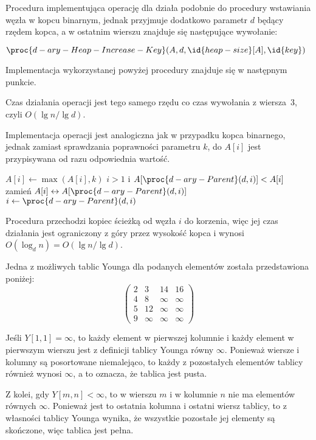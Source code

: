 \subproblem %
Procedura  implementująca operację  dla  działa podobnie do procedury wstawiania węzła w kopcu binarnym, jednak przyjmuje dodatkowo parametr $d$ będący rzędem kopca, a w ostatnim wierszu znajduje się następujące wywołanie:
\begin{codebox}
\setcounter{codelinenumber}{2}
\li	$\proc{d-ary-Heap-Increase-Key}(A,d,\id{heap-size}[A],\id{key})$
\end{codebox}
Implementacja wykorzystanej powyżej procedury znajduje się w następnym punkcie.

Czas działania operacji  jest tego samego rzędu co czas wywołania z wiersza~3, czyli $O(\lg n/\!\lg d)$.

\subproblem %
Implementacja operacji jest analogiczna jak w przypadku kopca binarnego, jednak zamiast sprawdzania poprawności parametru $k$, do $A[i]$ jest przypisywana od razu odpowiednia wartość.
\begin{codebox}
\li	$A[i]\gets\max(A[i],k)$
\li	\While $i>1$ i $A[\proc{d-ary-Parent}(d,i)]<A[i]$
\li		\Do
			zamień $A[i]\leftrightarrow A[\proc{d-ary-Parent}(d,i)]$
\li			$i\gets\proc{d-ary-Parent}(d,i)$
		\End
\end{codebox}
Procedura przechodzi kopiec ścieżką od węzła $i$ do korzenia, więc jej czas działania jest ograniczony z góry przez wysokość kopca i wynosi $O(\log_dn)=O(\lg n/\!\lg d)$.


\subproblem %
Jedna z możliwych tablic Younga dla podanych elementów została przedstawiona poniżej:
\[
	\begin{pmatrix}
		2 & 3 & 14 & 16 \\
		4 & 8 & \infty & \infty \\
		5 & 12 & \infty & \infty \\
		9 & \infty& \infty & \infty
	\end{pmatrix}
\]

\subproblem %
Jeśli $Y[1,1]=\infty$, to każdy element w pierwszej kolumnie i każdy element w pierwszym wierszu jest z definicji tablicy Younga równy $\infty$. Ponieważ wiersze i kolumny są posortowane niemalejąco, to każdy z pozostałych elementów tablicy również wynosi $\infty$, a to oznacza, że tablica jest pusta.

Z kolei, gdy $Y[m,n]<\infty$, to w wierszu $m$ i w kolumnie $n$ nie ma elementów równych $\infty$. Ponieważ jest to ostatnia kolumna i ostatni wiersz tablicy, to z własności tablicy Younga wynika, że wszystkie pozostałe jej elementy są skończone, więc tablica jest pełna.

